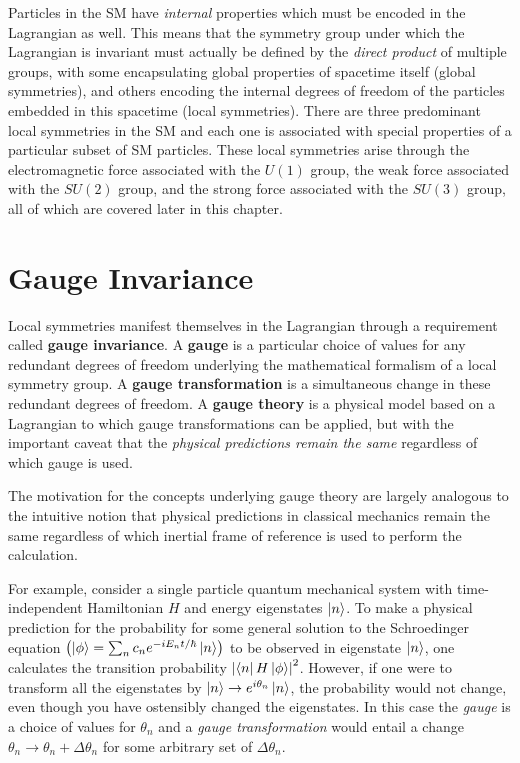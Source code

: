 Particles in the SM have \textit{internal} properties which must be encoded in the Lagrangian as well.
This means that the symmetry group under which the Lagrangian is invariant must actually be defined by the \textit{direct product} of multiple groups, with some encapsulating global properties of spacetime itself (global symmetries), and others encoding the internal degrees of freedom of the particles embedded in this spacetime (local symmetries).
There are three predominant local symmetries in the SM and each one is associated with special properties of a particular subset of SM particles.
These local symmetries arise through the electromagnetic force associated with the $U(1)$ group, the weak force associated with the $SU(2)$ group, and the strong force associated with the $SU(3)$ group, all of which are covered later in this chapter.


\section{Gauge Invariance}
Local symmetries manifest themselves in the Lagrangian through a requirement called \textbf{gauge invariance}.
A \textbf{gauge} is a particular choice of values for any redundant degrees of freedom underlying the mathematical formalism of a local symmetry group.
A \textbf{gauge transformation} is a simultaneous change in these redundant degrees of freedom.
A \textbf{gauge theory} is a physical model based on a Lagrangian to which gauge transformations can be applied, but with the important caveat that the \textit{physical predictions remain the same} regardless of which gauge is used.

The motivation for the concepts underlying gauge theory are largely analogous to the intuitive notion that physical predictions in classical mechanics remain the same regardless of which inertial frame of reference is used to perform the calculation.

For example, consider a single particle quantum mechanical system with time-independent Hamiltonian $H$ and energy eigenstates $\ket{n}$.
To make a physical prediction for the probability for some general solution to the Schroedinger equation $\left( \ket{\phi} = \sum_n c_n e^{-iE_nt / \hbar} \ket{n} \right)$ to be observed in eigenstate $\ket{n}$, one calculates the transition probability $\left| \bra{n} H \ket{\phi} \right|^2$.
However, if one were to transform all the eigenstates by $\ket{n} \rightarrow e^{i\theta_n} \ket{n}$, the probability would not change, even though you have ostensibly changed the eigenstates.
In this case the \textit{gauge} is a choice of values for $\theta_n$ and a \textit{gauge transformation} would entail a change $\theta_n \rightarrow \theta_n + \Delta\theta_n$ for some arbitrary set of $\Delta\theta_n$.

